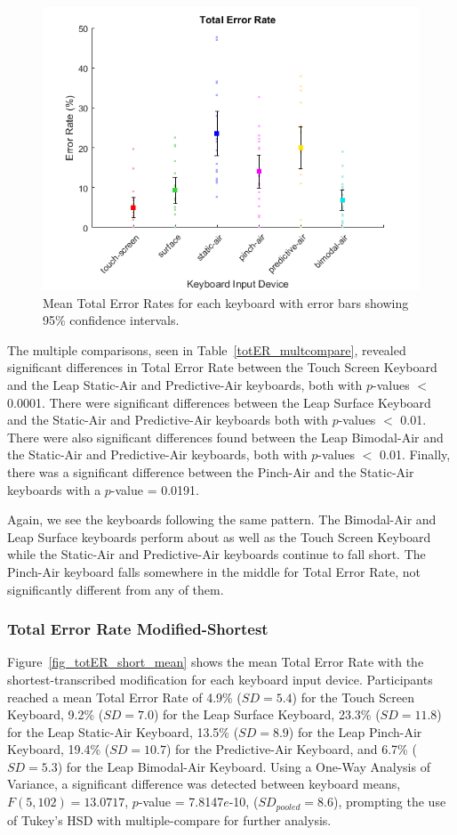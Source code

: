 \begin{figure}[h]
	\centering
	\includegraphics{fig_totER_mean}
	\caption[Mean Total Error Rates]{Mean Total Error Rates for each keyboard with error bars showing 95\% confidence intervals.}
	\label{fig_totER_mean}
\end{figure}

The multiple comparisons, seen in Table~\ref{totER_multcompare}, revealed significant differences in Total Error Rate between the Touch Screen Keyboard and the Leap Static-Air and Predictive-Air keyboards, both with $p$-values $<$ 0.0001. There were significant differences between the Leap Surface Keyboard and the Static-Air and Predictive-Air keyboards both with $p$-values $<$ 0.01. There were also significant differences found between the Leap Bimodal-Air and the Static-Air and Predictive-Air keyboards, both with $p$-values $<$ 0.01. Finally, there was a significant difference between the Pinch-Air and the Static-Air keyboards with a $p$-value = 0.0191.

Again, we see the keyboards following the same pattern. The Bimodal-Air and Leap Surface keyboards perform about as well as the Touch Screen Keyboard while the Static-Air and Predictive-Air keyboards continue to fall short. The Pinch-Air keyboard falls somewhere in the middle for Total Error Rate, not significantly different from any of them.

\subsubsection{Total Error Rate Modified-Shortest}
Figure~\ref{fig_totER_short_mean} shows the mean Total Error Rate with the shortest-transcribed modification for each keyboard input device. Participants reached a mean Total Error Rate of 4.9\% ($SD = 5.4$) for the Touch Screen Keyboard, 9.2\% ($SD = 7.0$) for the Leap Surface Keyboard, 23.3\% ($SD = 11.8$) for the Leap Static-Air Keyboard, 13.5\% ($SD = 8.9$) for the Leap Pinch-Air Keyboard, 19.4\% ($SD = 10.7$) for the Predictive-Air Keyboard, and 6.7\% ($SD = 5.3$) for the Leap Bimodal-Air Keyboard. Using a One-Way Analysis of Variance, a significant difference was detected between keyboard means, $F(5, 102) = 13.0717$, $p$-value = 7.8147$e$-10, ($SD_{pooled} = 8.6$), prompting the use of Tukey's HSD with multiple-compare for further analysis.

